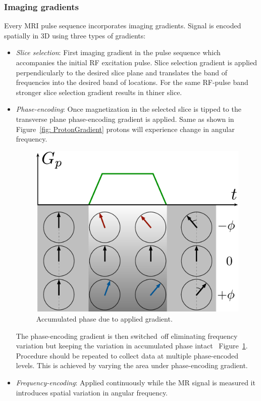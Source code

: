 \subsubsection{Imaging gradients}
Every MRI pulse sequence incorporates imaging gradients. 
Signal is encoded spatially in 3D using three types of gradients:
\begin{itemize}
	\item \textit{Slice selection}: First imaging gradient in the pulse sequence which accompanies the initial RF excitation pulse. Slice selection gradient is applied perpendicularly to the desired slice plane and translates the band of frequencies into the desired band of locations. For the same RF-pulse band stronger slice selection gradient results in thiner slice.
	\item \textit{Phase-encoding}: Once magnetization in the selected slice is tipped to the transverse plane phase-encoding gradient is applied. Same as shown in Figure~\ref{fig: ProtonGradient} protons will experience change in angular frequency. 
\begin{figure}[!htb]
\vspace{+0.2cm}
\centering
\includegraphics[scale=.45]{Figures/PhaseEncode.pdf}
\caption[Accumulated phase due to applied gradient]{Accumulated phase due to applied gradient.}
\label{fig: PhaseEncode}
\end{figure}
	The phase-encoding gradient is then switched~off eliminating frequency variation but keeping the variation in accumulated phase intact~ Figure~\ref{fig: PhaseEncode}. Procedure should be repeated to collect data at multiple phase-encoded levels. This is achieved by varying the area under phase-encoding gradient.
	\item \textit{Frequency-encoding}: Applied continuously while the MR signal is measured it introduces spatial variation in angular frequency.\end{itemize}
